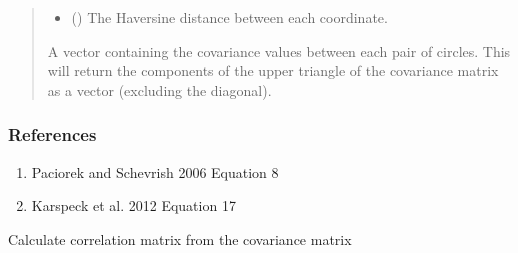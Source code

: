 \documentclass[letterpaper,10pt,english]{sphinxmanual}
\begin{document}
\begin{fulllineitems}
\begin{fulllineitems}
\begin{quote}
\begin{description}
\begin{itemize}
\item {}
\sphinxAtStartPar
{} () \textendash{} The Haversine distance between each coordinate.

\end{itemize}

\sphinxAtStartPar
{} \textendash{} A vector containing the covariance values between each pair of
circles. This will return the components of the upper triangle of
the covariance matrix as a vector (excluding the diagonal).

\sphinxAtStartPar
{}

\end{description}\end{quote}
\subsubsection*{References}
\begin{enumerate}
%
\item {}
\sphinxAtStartPar
Paciorek and Schevrish 2006  Equation 8

\item {}
\sphinxAtStartPar
Karspeck et al. 2012  Equation 17

\end{enumerate}

\end{fulllineitems}


\begin{fulllineitems}
\label{\detokenize{ellipse:glomar_gridding.ellipse.EllipseCovarianceBuilder.calculate_cor}}
\pysigstartsignatures
\pysiglinewithargsret
{}
{}
{}
\pysigstopsignatures
\sphinxAtStartPar
Calculate correlation matrix from the covariance matrix
\begin{quote}\begin{description}
\sphinxAtStartPar
{}


\end{description}
\end{quote}
\end{fulllineitems}
\end{fulllineitems}
\end{document}
